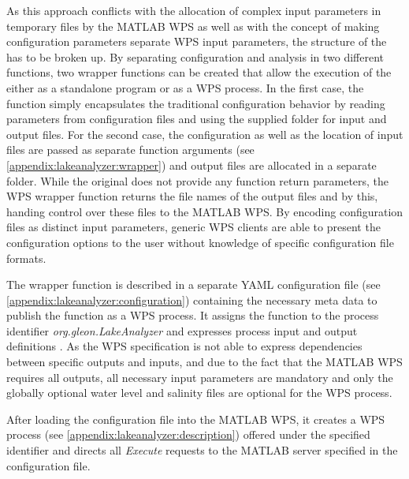   As this approach conflicts with the allocation of complex input parameters in temporary files by the MATLAB WPS as well as with the concept of making configuration parameters separate \ac{WPS} input parameters, the structure of the \la has to be broken up. By separating configuration and analysis in two different functions, two wrapper functions can be created that allow the execution of the \la either as a standalone program or as a WPS process. In the first case, the function simply encapsulates the traditional configuration behavior by reading parameters from configuration files and using the supplied folder for input and output files. For the second case, the configuration as well as the location of input files are passed as separate function arguments (see \cref{appendix:lakeanalyzer:wrapper}) and output files are allocated in a separate folder. While the original \la does not provide any function return parameters, the WPS wrapper function returns the file names of the output files and by this, handing control over these files to the MATLAB WPS. By encoding configuration files as distinct input parameters, generic WPS clients are able to present the configuration options to the user without knowledge of specific configuration file formats.

  The wrapper function is described in a separate YAML configuration file (see \cref{appendix:lakeanalyzer:configuration}) containing the necessary meta data to publish the function as a WPS process. It assigns the function to the process identifier \emph{org.gleon.LakeAnalyzer} and expresses process input and output definitions \citep[taken from the \la user manual,][]{lamanual}. As the WPS specification is not able to express dependencies between specific outputs and inputs, and due to the fact that the MATLAB WPS requires all outputs, all necessary input parameters are mandatory and only the globally optional water level and salinity files are optional for the WPS process.

  After loading the configuration file into the MATLAB WPS, it creates a WPS process (see \cref{appendix:lakeanalyzer:description}) offered under the specified identifier and directs all \emph{Execute} requests to the MATLAB server specified in the configuration file.
